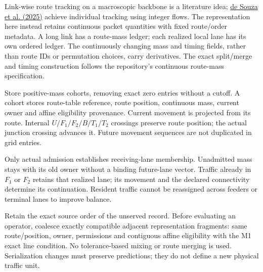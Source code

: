 \documentclass[10pt,a4paper]{article}
\newenvironment{revision}{\begingroup\color{revisionred}}{\par\endgroup}
\begin{document}
\begin{revision}
Link-wise route tracking on a macroscopic backbone is a literature idea;
\href{https://doi.org/10.1016/j.simpat.2025.103088}{de Souza et al. (2025)}
achieve individual tracking using integer flows. The representation here
instead retains continuous packet quantities with fixed route/order
metadata. A long link has a route-mass ledger; each realized local lane
has its own ordered ledger. The continuously changing mass and timing
fields, rather than route IDs or permutation choices, carry derivatives.
The exact split/merge and timing construction follows the repository's
continuous route-mass specification.
\end{revision}

Store positive-mass cohorts, removing exact zero entries without a cutoff.
A cohort stores route-table reference, route position, continuous mass,
current owner and affine eligibility provenance. Current movement is
projected from its route. Internal $U/F_1/F_2/B/T_1/T_2$ crossings preserve route
position; the actual junction crossing advances it. Future movement
sequences are not duplicated in grid entries.

Only actual admission establishes receiving-lane membership. Unadmitted
mass stays with its old owner without a binding future-lane vector.
Traffic already in $F_1$ or $F_2$ retains that realized lane; its movement
and the declared connectivity determine its continuation. Resident traffic
cannot be reassigned across feeders or terminal lanes to improve balance.

Retain the exact source order of the unserved record. Before evaluating
an operator, coalesce exactly compatible adjacent representation fragments:
same route/position, owner, permissions and contiguous affine eligibility
with the M1 exact line condition. No tolerance-based mixing or route
merging is used. Serialization changes must preserve predictions; they
do not define a new physical traffic unit.
\end{document}
